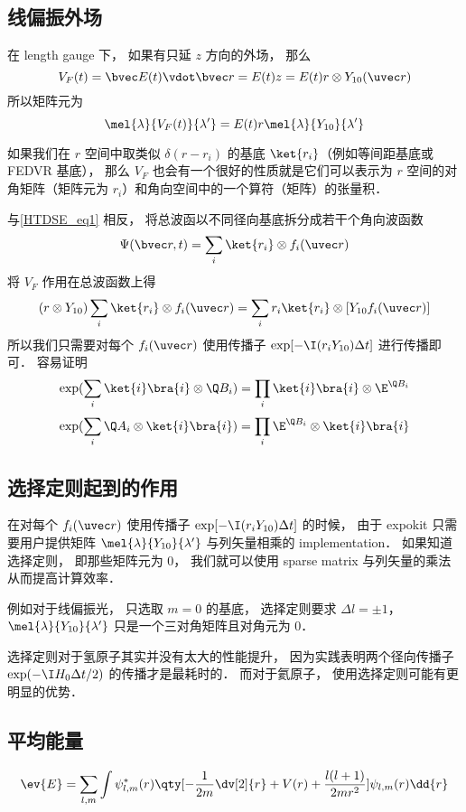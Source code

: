 \subsection{线偏振外场}
在 length gauge 下， 如果有只延 $z$ 方向的外场， 那么
\begin{equation}
V_F(t) = \bvec E(t) \vdot \bvec r =  E(t) z = E(t) r \otimes Y_{10}(\uvec r)
\end{equation}
所以矩阵元为
\begin{equation}
\mel{\lambda}{V_F(t)}{\lambda'} =  E(t) r \mel{\lambda}{Y_{10}}{\lambda'}
\end{equation}

如果我们在 $r$ 空间中取类似 $\delta(r - r_i)$ 的基底 $\ket{r_i}$（例如等间距基底或 FEDVR 基底）， 那么 $V_F$ 也会有一个很好的性质就是它们可以表示为 $r$ 空间的对角矩阵（矩阵元为 $r_i$）和角向空间中的一个算符（矩阵）的张量积． 

与\autoref{HTDSE_eq1} 相反， 将总波函以不同径向基底拆分成若干个角向波函数
\begin{equation}
\Psi(\bvec r, t) = \sum_i \ket{r_i} \otimes f_i(\uvec r)
\end{equation}
将 $V_F$ 作用在总波函数上得
\begin{equation}
(r \otimes Y_{10})\sum_i \ket{r_i} \otimes f_i(\uvec r)
= \sum_i r_i\ket{r_i} \otimes [Y_{10} f_i(\uvec r)]
\end{equation}
所以我们只需要对每个 $f_i(\uvec r)$ 使用传播子 $\exp[-\I (r_i Y_{10}) \Delta t]$ 进行传播即可． 容易证明%
\begin{equation}
\exp(\sum_i \ket{i}\bra{i} \otimes \Q B_i) = \prod_i \ket{i}\bra{i} \otimes  \E^{\Q B_i}
\end{equation}
\begin{equation}
\exp(\sum_i  \Q A_i \otimes \ket{i}\bra{i}) = \prod_i  \E^{\Q B_i} \otimes \ket{i}\bra{i}
\end{equation}

\subsection{选择定则起到的作用}
在对每个 $f_i(\uvec r)$ 使用传播子 $\exp[-\I (r_i Y_{10}) \Delta t]$ 的时候， 由于 expokit 只需要用户提供矩阵 $\mel{\lambda}{Y_{10}}{\lambda'}$ 与列矢量相乘的 implementation． 如果知道选择定则， 即那些矩阵元为 0， 我们就可以使用 sparse matrix 与列矢量的乘法从而提高计算效率．

例如对于线偏振光， 只选取 $m = 0$ 的基底， 选择定则要求 $\Delta l = \pm 1$， $\mel{\lambda}{Y_{10}}{\lambda'}$ 只是一个三对角矩阵且对角元为 0．

选择定则对于氢原子其实并没有太大的性能提升， 因为实践表明两个径向传播子 $\exp(-\I H_0 \Delta t/2)$ 的传播才是最耗时的． 而对于氦原子， 使用选择定则可能有更明显的优势．


\subsection{平均能量}
\begin{equation}
\ev{E} = \sum_{l,m} \int \psi^*_{l,m}(r) \qty[-\frac{1}{2m}\dv[2]{r} + V(r) + \frac{l(l+1)}{2mr^2}] \psi_{l,m}(r) \dd{r}
\end{equation}
